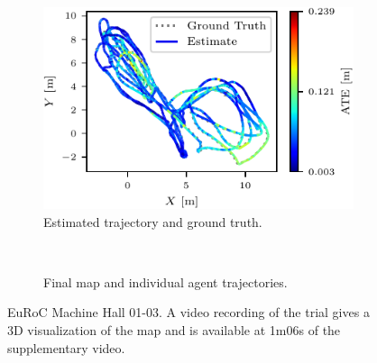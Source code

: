 \begin{figure}[h]
    \centering
    \captionsetup{format=plain}
    \begin{subfigure}[t]{0.5\linewidth}
        \centering
        \includegraphics[width=0.9\linewidth]{figures/apr11_mh_trajectory_b_trajectory.pdf}
        \caption{Estimated trajectory and ground truth.}
    \end{subfigure}\hfill%
    ~
    \begin{subfigure}[t]{0.45\linewidth}
        \centering
        \caption{Final map and individual agent trajectories.}
    \end{subfigure}

    \caption{EuRoC Machine Hall 01-03. A video recording of the trial gives a 3D visualization of the map and is available at 1m06s of the supplementary video\protect\footnotemark[1].}
    \label{fig:euroc-traj}

\end{figure}
